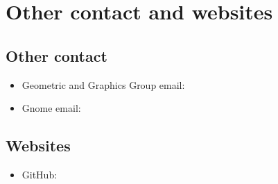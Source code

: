 % 
% 
% 
     
\section{Other contact and websites}

    \subsection{Other contact}
        \begin{indentpar}{72pt}
            \begin{itemize}
                \item Geometric and Graphics Group email: 
                \item Gnome email: 
            \end{itemize}           
        \end{indentpar}
        
    \subsection{Websites}
        \begin{indentpar}{72pt}
            \begin{itemize}
                \item GitHub: 
            \end{itemize}            
        \end{indentpar}


